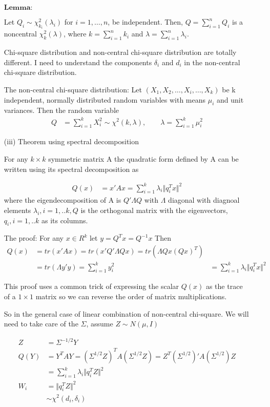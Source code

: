 \begin{itemize}
		$\textbf{Lemma:}$	
		
		Let $Q_i \sim \chi^2 _{k_i}(\lambda_i)$ for $i=1,…,n$, be independent. Then, $Q = \sum_{i=1}^n Q_i$ is a noncentral $\chi^2_k(\lambda)$, where $k = \sum_{i=1}^n k_i$ and $\lambda =\sum_{i=1}^n \lambda_i$.
		
		Chi-square distribution and non-central chi-square distribution are totally different. I need to understand the components $\delta_i$ and $d_i$ in the non-central chi-square distribution.
		
		
		The non-central chi-square distribution: Let $(X_{1},X_{2},\ldots ,X_{i},\ldots ,X_{k})$ be k independent, normally distributed random variables with means $\mu _{i}$ and unit variances. Then the random variable
		\begin{align*}
			Q &= \sum_{i=1}^k X_i^2 \sim \chi^2(k, \lambda), \qquad \lambda = \sum_{i=1}^k \mu_i^2
		\end{align*}
	
	\item [(iii)] Theorem using spectral decomposition
	
	For any $k \times k$ symmetric matrix A the quadratic form defined by A can be written using its spectral decomposition as
	
\begin{align*}
	Q(x) &= x' A x = \sum_{i=1}^k \lambda_i \Vert q_i^T x\Vert^2
\end{align*}	
	where the eigendecomposition of A is $Q'\Lambda Q$ with $\Lambda$ diagonal with diagnoal elements $\lambda_i, i=1,..k, Q$ is the orthogonal matrix with the eigenvectors, $q_i, i=1,..k$ as its columns. 
	
	The proof: For any $x \in R^k$ let $y= Q^T x = Q^{-1} x$ Then
\begin{align*}
	Q(x) &= tr(x' A x )= tr(x' Q' \Lambda Q x) = tr( \Lambda  Qx (Qx)^T)\\
	&= tr(\Lambda y' y) = \sum_{i=1}^k y_i^2
	&= \sum_{i=1}^k \lambda_i \Vert q_i^T x\Vert^2
\end{align*}		
	
	This proof uses a common trick of expressing the scalar $Q(x)$ as the trace of a $1 \times 1$ matrix so we can reverse the order of matrix multiplications.
	
	So in the general case of linear combination of non-central chi-square. We will need to take care of the $\Sigma$, assume $Z \sim N(\mu, I)$
	
\begin{align*}
	Z &= \Sigma^{-1/2} Y \\
	Q(Y) &= Y^T A Y = (\Sigma^{1/2} Z)^T A (\Sigma^{1/2} Z) = Z^T (\Sigma^{1/2})' A (\Sigma^{1/2}) Z \\
	&=  \sum_{i=1}^k \lambda_i \Vert q_i^T Z\Vert^2\\
	W_i &= \Vert q_i^T Z\Vert^2 \\
	& \sim \chi^2(d_i, \delta_i)
\end{align*}	


\end{itemize}
